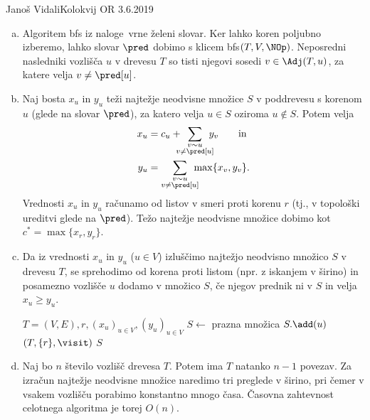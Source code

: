 \begin{naloga}{Janoš Vidali}{Kolokvij OR 3.6.2019}
\begin{odgovor}
\begin{enumerate}[(a)]
\item Algoritem {\sc bfs} iz naloge~\res[bfs] vrne želeni slovar.
Ker lahko koren poljubno izberemo,
lahko slovar $\pred$ dobimo s klicem {\sc bfs}$(T, V, \NOp)$.
Neposredni nasledniki vozlišča $u$ v drevesu $T$
so tisti njegovi sosedi $v \in \Adj(T, u)$,
za katere velja $v \ne \pred[u]$.

\item Naj bosta $x_u$ in $y_u$ teži najtežje neodvisne množice $S$
v poddrevesu s korenom $u$ (glede na slovar $\pred$),
za katero velja $u \in S$ oziroma $u \not\in S$.
Potem velja
\begin{align*}
x_u &= c_u + \!\!\!\!\sum_{\substack{v \sim u \\ v \ne \pred[u]}}\!\!\!\! y_v
\qquad \text{in} \\
y_u &= \sum_{\substack{v \sim u \\ v \ne \pred[u]}}\!\!\!\! \max\{x_v, y_v\} .
\end{align*}
Vrednosti $x_u$ in $y_u$ računamo od listov v smeri proti korenu $r$
(tj., v topološki ureditvi glede na $\pred$).
Težo najtežje neodvisne množice dobimo kot $c^* = \max\{x_r, y_r\}$.

\item Da iz vrednosti $x_u$ in $y_u$ ($u \in V$)
izluščimo najtežjo neodvisno množico $S$ v drevesu $T$,
se sprehodimo od korena proti listom (npr. z iskanjem v širino)
in posamezno vozlišče $u$ dodamo v množico $S$,
če njegov prednik ni v $S$ in velja $x_u \ge y_u$.

\begin{small}
\begin{algorithmic}
%
        {$T = (V, E), r, (x_u)_{u \in V}, (y_u)_{u \in V}$}
    \State $S \gets$ prazna množica
            \State $S.\add(u)$
        \EndIf
    \EndFunction
    $(T, \{r\}, \visit)$
    \State \Return $S$
\EndFunction
\end{algorithmic}
\end{small}

\item Naj bo $n$ število vozlišč drevesa $T$.
Potem ima $T$ natanko $n-1$ povezav.
Za izračun najtežje neodvisne množice naredimo tri preglede v širino,
pri čemer v vsakem vozlišču porabimo konstantno mnogo časa.
Časovna zahtevnost celotnega algoritma je torej $O(n)$.


\end{enumerate}
\end{odgovor}
\end{naloga}
